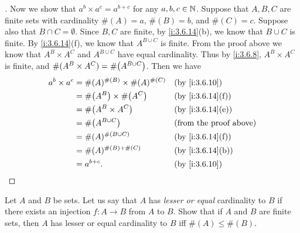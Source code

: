 \begin{proof}[]
  Now we show that \(a^b \times a^c = a^{b + c}\) for any \(a, b, c \in \mathbb{N}\).
  Suppose that \(A, B, C\) are finite sets with cardinality \(\#(A) = a\), \(\#(B) = b\), and \(\#(C) = c\).
  Suppose also that \(B \cap C = \emptyset\).
  Since \(B, C\) are finite, by \cref{i:3.6.14}(b), we know that \(B \cup C\) is finite.
  By \cref{i:3.6.14}(f), we know that \(A^{B \cup C}\) is finite.
  From the proof above we know that \(A^B \times A^C\) and \(A^{B \cup C}\) have equal cardinality.
  Thus by \cref{i:3.6.8}, \(A^B \times A^C\) is finite, and \(\#(A^B \times A^C) = \#\pa{A^{B \cup C}}\).
  Then we have
  \begin{align*}
    a^b \times a^c & = \#(A)^{\#(B)} \times \#(A)^{\#(C)} &  & \by{i:3.6.10}                 \\
                   & = \#\pa{A^B} \times \#\pa{A^C}       &  & \by{i:3.6.14}[f]              \\
                   & = \#\pa{A^B \times A^C}              &  & \by{i:3.6.14}[e]              \\
                   & = \#\pa{A^{B \cup C}}                &  & \text{(from the proof above)} \\
                   & = \#(A)^{\#(B \cup C)}               &  & \by{i:3.6.14}[f]              \\
                   & = \#(A)^{\#(B) + \#(C)}              &  & \by{i:3.6.14}[b]              \\
                   & = a^{b + c}.                         &  & \by{i:3.6.10}
  \end{align*}
\end{proof}

\begin{ex}\label{i:ex:3.6.7}
  Let \(A\) and \(B\) be sets.
  Let us say that \(A\) has \emph{lesser or equal} cardinality to \(B\) if there exists an injection \(f : A \to B\) from \(A\) to \(B\).
  Show that if \(A\) and \(B\) are finite sets, then \(A\) has lesser or equal cardinality to \(B\) iff \(\#(A) \leq \#(B)\).
\end{ex}

